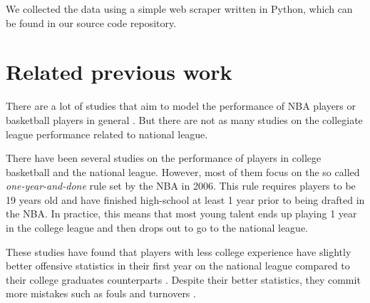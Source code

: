 We collected the data using a simple web scraper written in Python, which can be
found in our source code repository.

\section{Related previous work}%
\label{sec:previous-work}

There are a lot of studies that aim to model the performance of NBA players
or basketball players in general \cite{terner_modeling_2020,
casals_modelling_2013, kokanauskas_modelling_2021}.  But there are not as many
studies on the collegiate league performance related to national league.

There have been several studies on the performance of players in college
basketball and the national league. However, most of them focus on the so called
\emph{one-year-and-done} rule \cite{noauthor_nba_2006} set by the NBA in 2006.
This rule requires players to be 19 years old and have finished high-school at least
1 year prior to being drafted in the NBA. In practice, this means that most
young talent ends up playing 1 year in the college league and then drops out to
go to the national league.

These studies have found that players with less college experience have slightly
better offensive statistics in their first year on the national league compared to their
college graduates counterparts \cite{ashley_explaining_2017}. Despite their better statistics,
they commit more mistakes such as fouls and turnovers \cite{zestcott_one_2020}.

